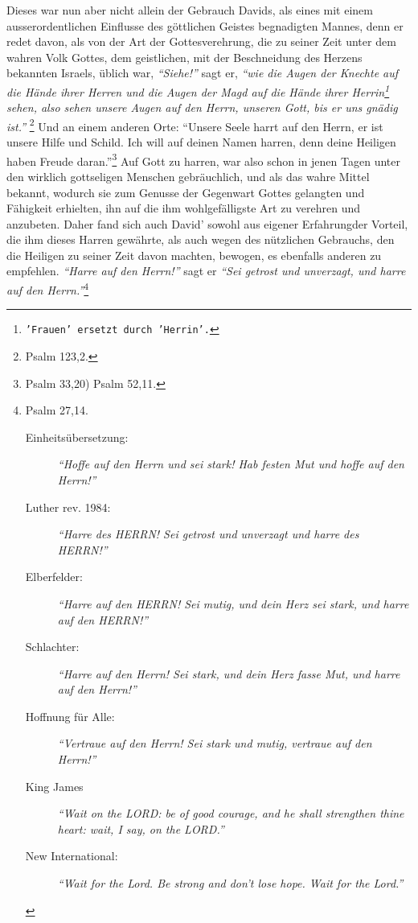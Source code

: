 \medskip

Dieses war nun aber nicht allein der Gebrauch Davids, als eines mit einem
ausserordentlichen Einflusse des göttlichen Geistes begnadigten Mannes, denn er
redet davon, als von der Art der Gottesverehrung, die zu seiner Zeit unter dem
wahren Volk Gottes, dem geistlichen, mit der
Beschneidung des Herzens bekannten
Israels, üblich war, \textit{"`Siehe!"'} sagt er,
\textit{"`wie die Augen der Knechte auf die
Hände ihrer Herren und die Augen der Magd auf die Hände ihrer
Herrin\footnote{\texttt{'Frauen' ersetzt durch 'Herrin'.}} sehen,
also sehen unsere Augen auf den Herrn, unseren Gott, bis er uns gnädig
ist."'}
\footnote{Psalm 123,2.}
Und an einem anderen Orte:
"`Unsere Seele harrt auf den Herrn, er ist unsere Hilfe und Schild. Ich will
auf deinen Namen harren,
denn deine Heiligen haben Freude daran."'\footnote{Psalm 33,20) Psalm 52,11.}
Auf Gott zu harren, war also schon in jenen Tagen unter den wirklich gottseligen
Menschen gebräuchlich, und als das wahre Mittel bekannt, wodurch sie zum Genusse
der Gegenwart Gottes gelangten und Fähigkeit
erhielten, ihn auf die ihm
wohlgefälligste Art zu verehren und anzubeten. Daher fand sich auch David'
sowohl aus eigener Erfahrungder Vorteil, die ihm
dieses Harren gewährte, als
auch wegen des nützlichen Gebrauchs, den die Heiligen zu seiner Zeit davon
machten, bewogen, es ebenfalls anderen zu empfehlen.
\textit{"`Harre auf den Herrn!"'} sagt
er
\textit{"`Sei getrost und unverzagt, und harre auf den Herrn."'}\footnote{Psalm
27,14.
\begin{description}
 \item[Einheitsübersetzung:] \textit{"`Hoffe auf den Herrn und sei stark! Hab
festen Mut und hoffe auf den Herrn!"'}
 \item[Luther rev. 1984:] \textit{"`Harre des HERRN! Sei getrost und unverzagt
und harre des HERRN!"'}
 \item[Elberfelder:] \textit{"`Harre auf den HERRN! Sei mutig, und dein Herz sei
stark, und harre auf den HERRN!"'}
 \item[Schlachter:] \textit{"`Harre auf den Herrn! Sei stark, und dein Herz
fasse Mut, und harre auf den Herrn!"'}
 \item[Hoffnung für Alle:] \textit{"`Vertraue auf den Herrn! Sei stark und
mutig, vertraue auf den Herrn!"'}
 \item[King James]
\textit{ "`Wait on the LORD: be of good courage, and he shall strengthen thine
heart: wait, I say, on the LORD."'}
 \item[New International:] \textit{ "`Wait for the Lord. Be strong and don't
lose hope. Wait for the Lord."'}
 \end{description}
}
